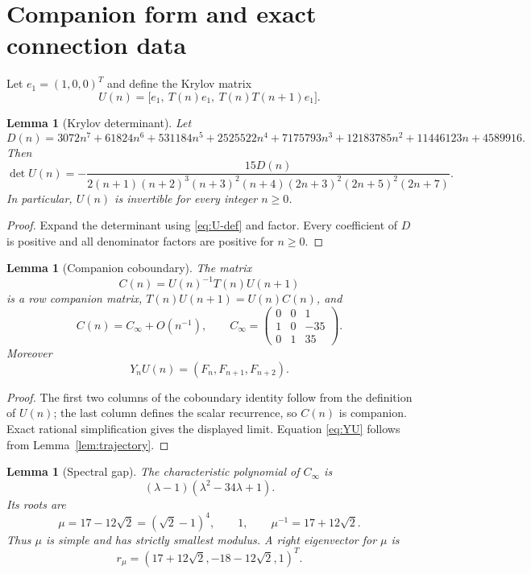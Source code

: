 \documentclass[11pt]{article}
\newtheorem{lemma}[theorem]{Lemma}
\theoremstyle{remark}
\begin{document}
\section{Companion form and exact connection data}

Let $e_1=(1,0,0)^T$ and define the Krylov matrix
\begin{equation}\label{eq:U-def}
 U(n)=\bigl[e_1,\ T(n)e_1,\ T(n)T(n+1)e_1\bigr].
\end{equation}

\begin{lemma}[Krylov determinant]\label{lem:U-det}
Let
\[
 D(n)=3072n^7+61824n^6+531184n^5+2525522n^4+7175793n^3
 +12183785n^2+11446123n+4589916.
\]
Then
\[
 \det U(n)=
 -\frac{15D(n)}{2(n+1)(n+2)^3(n+3)^2(n+4)
 (2n+3)^2(2n+5)^2(2n+7)}.
\]
In particular, $U(n)$ is invertible for every integer $n\geq0$.
\end{lemma}

\begin{proof}
Expand the determinant using \eqref{eq:U-def} and factor.  Every
coefficient of $D$ is positive and all denominator factors are
positive for $n\geq0$.
\end{proof}

\begin{lemma}[Companion coboundary]\label{lem:companion}
The matrix
\[
 C(n)=U(n)^{-1}T(n)U(n+1)
\]
is a row companion matrix, $T(n)U(n+1)=U(n)C(n)$, and
\[
 C(n)=C_\infty+O(n^{-1}),\qquad
 C_\infty=\begin{pmatrix}0&0&1\\1&0&-35\\0&1&35\end{pmatrix}.
\]
Moreover
\begin{equation}\label{eq:YU}
                 Y_nU(n)=(F_n,F_{n+1},F_{n+2}).
\end{equation}
\end{lemma}

\begin{proof}
The first two columns of the coboundary identity follow from the
definition of $U(n)$; the last column defines the scalar recurrence,
so $C(n)$ is companion.  Exact rational simplification gives the
displayed limit.  Equation \eqref{eq:YU} follows from
Lemma~\ref{lem:trajectory}.
\end{proof}

\begin{lemma}[Spectral gap]\label{lem:spectral-gap}
The characteristic polynomial of $C_\infty$ is
\[
 (\lambda-1)(\lambda^2-34\lambda+1).
\]
Its roots are
\[
 \mu=17-12\sqrt2=(\sqrt2-1)^4,\qquad 1,\qquad
 \mu^{-1}=17+12\sqrt2.
\]
Thus $\mu$ is simple and has strictly smallest modulus.  A right
eigenvector for $\mu$ is
\begin{equation}\label{eq:rmu}
 r_\mu=(17+12\sqrt2,-18-12\sqrt2,1)^T.
\end{equation}
\end{lemma}
\end{document}

